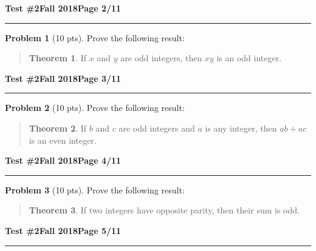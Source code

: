\documentclass[11pt]{article}
\theoremstyle{definition}
\newtheorem{problem}{Problem}
\theoremstyle{theorem}
\newtheorem*{theorem}{Theorem}
\begin{document}
\hfill{\large\bf Test \#2}\hfill{\large\bf Fall 2018}\hfill{\large\bf Page 2/11}\hrule

\bigskip
\begin{problem}[10 pts]
  Prove the following result:
  \vspace{-0.75cm}
  \begin{quotation}
    \begin{theorem}
      If $x$ and $y$ are odd integers, then $xy$ is an odd integer.
    \end{theorem}
  \end{quotation}
\end{problem}
\newpage

\hfill{\large\bf Test \#2}\hfill{\large\bf Fall 2018}\hfill{\large\bf Page 3/11}\hrule

\bigskip
\begin{problem}[10 pts]
  Prove the following result:
  \vspace{-0.75cm}
  \begin{quotation}
    \begin{theorem}
      If $b$ and $c$ are odd integers and $a$ is any integer, then $ab+ac$ is an even integer.
    \end{theorem}
  \end{quotation}
\end{problem}
\newpage

\hfill{\large\bf Test \#2}\hfill{\large\bf Fall 2018}\hfill{\large\bf Page 4/11}\hrule

\bigskip
\begin{problem}[10 pts]
  Prove the following result:
  \vspace{-0.75cm}
  \begin{quotation}
    \begin{theorem}
      If two integers have opposite parity, then their sum is odd.
    \end{theorem}
  \end{quotation}
\end{problem}
\newpage

\hfill{\large\bf Test \#2}\hfill{\large\bf Fall 2018}\hfill{\large\bf Page 5/11}\hrule
\end{document}
